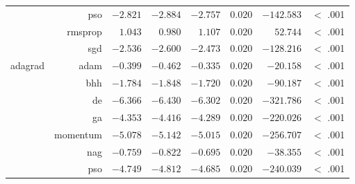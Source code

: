 \begin{table}[htbp]
{\begin{tabular}{lrrrrrrr}
                                       & pso                  & $-2.821$             & $-2.884$                                        & $-2.757$             & $0.020$              & $-142.583$           & $<$ .001    \\
                                       & rmsprop              & $1.043$              & $0.980$                                         & $1.107$              & $0.020$              & $52.744$             & $<$ .001    \\
                                       & sgd                  & $-2.536$             & $-2.600$                                        & $-2.473$             & $0.020$              & $-128.216$           & $<$ .001    \\
                  adagrad              & adam                 & $-0.399$             & $-0.462$                                        & $-0.335$             & $0.020$              & $-20.158$            & $<$ .001    \\
                  $ $                  & bhh                  & $-1.784$             & $-1.848$                                        & $-1.720$             & $0.020$              & $-90.187$            & $<$ .001    \\
                                       & de                   & $-6.366$             & $-6.430$                                        & $-6.302$             & $0.020$              & $-321.786$           & $<$ .001    \\
                                       & ga                   & $-4.353$             & $-4.416$                                        & $-4.289$             & $0.020$              & $-220.026$           & $<$ .001    \\
                                       & momentum             & $-5.078$             & $-5.142$                                        & $-5.015$             & $0.020$              & $-256.707$           & $<$ .001    \\
                                       & nag                  & $-0.759$             & $-0.822$                                        & $-0.695$             & $0.020$              & $-38.355$            & $<$ .001    \\
                                       & pso                  & $-4.749$             & $-4.812$                                        & $-4.685$             & $0.020$              & $-240.039$           & $<$ .001    \\

\end{tabular}}
\end{table}
